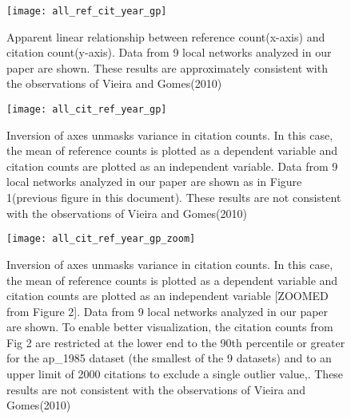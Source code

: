 \documentclass[11pt, oneside]{article}   	%
\begin{document}
 \newpage

\begin{figure}[tbhp]
\centering
\texttt{[image: all\_ref\_cit\_year\_gp]}     
\caption{Apparent linear relationship between reference count(x-axis) and citation count(y-axis). Data from 9 local networks analyzed in our paper are shown. These results are approximately consistent with the observations of Vieira and Gomes(2010)} 
\label{fig:refcit}
\end{figure}
\newpage

\begin{figure}[tbhp]
\centering
\texttt{[image: all\_cit\_ref\_year\_gp]}     
\caption{Inversion of axes unmasks variance in citation counts. In this case, the mean of reference counts is plotted as a dependent variable and citation counts are plotted as an independent variable. Data from 9 local networks analyzed in our paper are shown as in Figure 1(previous figure in this document). These results are not consistent with the observations  of Vieira and Gomes(2010)} 
\label{fig:citref}
\end{figure}
\newpage

\begin{figure}[tbhp]
\centering
\texttt{[image: all\_cit\_ref\_year\_gp\_zoom]}     
\caption{Inversion of axes unmasks variance in citation counts. In this case, the mean of reference counts is plotted as a dependent variable and citation counts are plotted as an independent variable [ZOOMED from Figure 2]. Data from 9 local networks analyzed in our paper are shown. To enable better visualization, the citation counts from Fig 2 are restricted at the lower end to the 90th percentile or greater for the ap\_1985 dataset (the smallest of the 9 datasets) and to an upper limit of 2000 citations to exclude a single outlier value,. These results are not consistent with the observations  of Vieira and Gomes(2010)} 
\label{fig:citref2}
\end{figure}
\newpage
\end{document}
